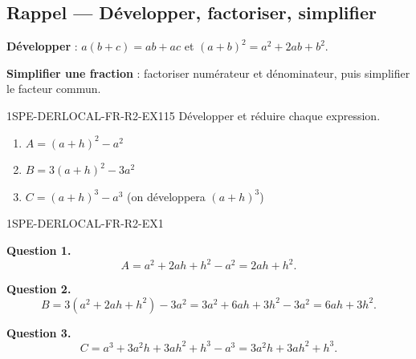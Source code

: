 

\subsection*{Rappel — Développer, factoriser, simplifier}

\textbf{Développer} : $a(b+c) = ab + ac$ et $(a+b)^2 = a^2 + 2ab + b^2$.

\textbf{Simplifier une fraction} : factoriser numérateur et dénominateur, puis simplifier le facteur commun.


\begin{exercice}{1SPE-DERLOCAL-FR-R2-EX1}{1}{5}
Développer et réduire chaque expression.
\begin{enumerate}
  \item $A = (a+h)^2 - a^2$
  \item $B = 3(a+h)^2 - 3a^2$
  \item $C = (a+h)^3 - a^3$ \quad (on développera $(a+h)^3$)
\end{enumerate}
\end{exercice}


\begin{corrige}{1SPE-DERLOCAL-FR-R2-EX1}


\textbf{Question 1.}
\[
A = a^2 + 2ah + h^2 - a^2 = 2ah + h^2.
\]

\textbf{Question 2.}
\[
B = 3(a^2 + 2ah + h^2) - 3a^2 = 3a^2 + 6ah + 3h^2 - 3a^2 = 6ah + 3h^2.
\]


\textbf{Question 3.}
\[
C = a^3 + 3a^2h + 3ah^2 + h^3 - a^3 = 3a^2h + 3ah^2 + h^3.
\]

\end{corrige}


